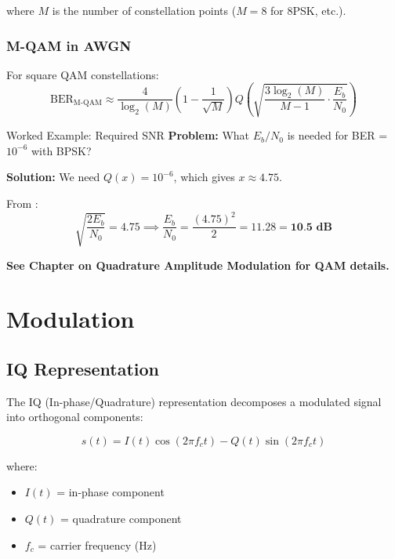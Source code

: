 where $M$ is the number of constellation points ($M = 8$ for 8PSK, etc.).

\subsubsection{M-QAM in AWGN}

For square QAM constellations:
\begin{equation}
\label{eq:ber-qam}
\text{BER}_{\text{M-QAM}} \approx \frac{4}{\log_2(M)}\left(1 - \frac{1}{\sqrt{M}}\right) Q\left(\sqrt{\frac{3\log_2(M)}{M-1} \cdot \frac{E_b}{N_0}}\right)
\end{equation}

\begin{calloutbox}{Worked Example: Required SNR}
\textbf{Problem:} What $E_b/N_0$ is needed for BER = $10^{-6}$ with BPSK?

\textbf{Solution:} We need $Q(x) = 10^{-6}$, which gives $x \approx 4.75$.

From :
\[
\sqrt{\frac{2E_b}{N_0}} = 4.75 \implies \frac{E_b}{N_0} = \frac{(4.75)^2}{2} = 11.28 = \textbf{10.5~dB}
\]
\end{calloutbox}

\textbf{See Chapter on Quadrature Amplitude Modulation for QAM details.}

\section{Modulation}
\label{sec:modulation}

\subsection{IQ Representation}
\label{subsec:iq-representation}

The IQ (In-phase/Quadrature) representation decomposes a modulated signal into orthogonal components:

\begin{equation}
\label{eq:iq-time}
s(t) = I(t)\cos(2\pi f_c t) - Q(t)\sin(2\pi f_c t)
\end{equation}

where:
\begin{itemize}
\item $I(t)$ = in-phase component
\item $Q(t)$ = quadrature component
\item $f_c$ = carrier frequency (Hz)
\end{itemize}

